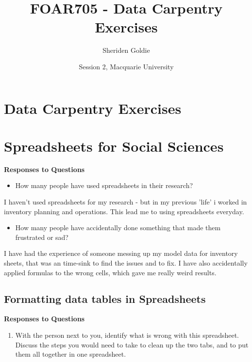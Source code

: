 \documentclass{article}
\title{FOAR705 - Data Carpentry Exercises}
\author{Sheriden Goldie}
\date{Session 2, Macquarie University}
\begin{document}
\maketitle

\section*{Data Carpentry Exercises}
\tableofcontents
\pagebreak

\section{Spreadsheets for Social Sciences}
\textbf{Responses to Questions}

\begin{itemize}
    \item How many people have used spreadsheets in their research?
\end{itemize}

I haven't used spreadsheets for my research - but in my previous 'life' i worked in inventory planning and operations. This lead me to using spreadsheets everyday.

\begin{itemize}
    \item How many people have accidentally done something that made them frustrated or sad?
\end{itemize}

I have had the experience of someone messing up my model data for inventory sheets, that was an time-sink to find the issues and to fix. I have also accidentally applied formulas to the wrong cells, which gave me really weird results. 

\subsection{Formatting data tables in Spreadsheets}
\textbf{Responses to Questions}

\begin{enumerate}
    \item With the person next to you, identify what is wrong with this spreadsheet. Discuss the steps you would need to take to clean up the two tabs, and to put them all together in one spreadsheet.
\end{enumerate} 
\end{document}
